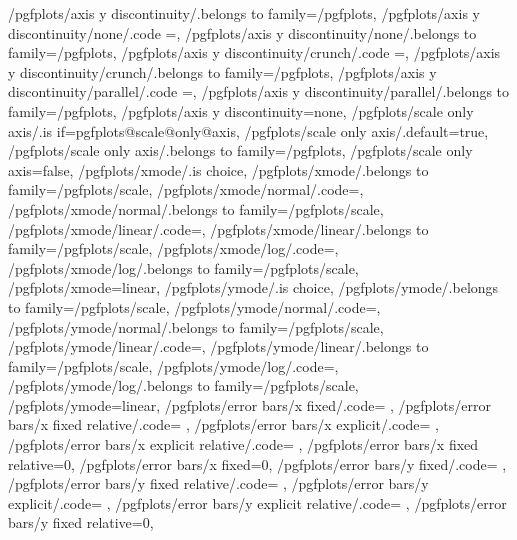 {	/pgfplots/axis y discontinuity/.belongs to family=/pgfplots, %
	/pgfplots/axis y discontinuity/none/.code	={\def\pgfplots@yaxisdiscontnum{0}},
	/pgfplots/axis y discontinuity/none/.belongs to family=/pgfplots, %
	/pgfplots/axis y discontinuity/crunch/.code	={\def\pgfplots@yaxisdiscontnum{1}},
	/pgfplots/axis y discontinuity/crunch/.belongs to family=/pgfplots, %
	/pgfplots/axis y discontinuity/parallel/.code	={\def\pgfplots@yaxisdiscontnum{2}},
	/pgfplots/axis y discontinuity/parallel/.belongs to family=/pgfplots, %
	/pgfplots/axis y discontinuity=none,
	/pgfplots/scale only axis/.is if=pgfplots@scale@only@axis,
	/pgfplots/scale only axis/.default=true,
	/pgfplots/scale only axis/.belongs to family=/pgfplots,
	/pgfplots/scale only axis=false,
	/pgfplots/xmode/.is choice,
	/pgfplots/xmode/.belongs to family=/pgfplots/scale,
	/pgfplots/xmode/normal/.code={\pgfplots@xislineartrue},
	/pgfplots/xmode/normal/.belongs to family=/pgfplots/scale,
	/pgfplots/xmode/linear/.code={\pgfplots@xislineartrue},
	/pgfplots/xmode/linear/.belongs to family=/pgfplots/scale,
	/pgfplots/xmode/log/.code={\pgfplots@xislinearfalse},
	/pgfplots/xmode/log/.belongs to family=/pgfplots/scale,
	/pgfplots/xmode=linear,
	/pgfplots/ymode/.is choice,
	/pgfplots/ymode/.belongs to family=/pgfplots/scale,
	/pgfplots/ymode/normal/.code={\pgfplots@yislineartrue},
	/pgfplots/ymode/normal/.belongs to family=/pgfplots/scale,
	/pgfplots/ymode/linear/.code={\pgfplots@yislineartrue},
	/pgfplots/ymode/linear/.belongs to family=/pgfplots/scale,
	/pgfplots/ymode/log/.code={\pgfplots@yislinearfalse},
	/pgfplots/ymode/log/.belongs to family=/pgfplots/scale,
	/pgfplots/ymode=linear,
	/pgfplots/error bars/x fixed/.code=				\def\pgfplots@errorbars@xfixed{#1}\def\pgfplots@errorbars@xmode{0},
	/pgfplots/error bars/x fixed relative/.code=		\def\pgfplots@errorbars@xrel{#1}\def\pgfplots@errorbars@xmode{1},
	/pgfplots/error bars/x explicit/.code=			\def\pgfplots@errorbars@xmode{2},
	/pgfplots/error bars/x explicit relative/.code=	\def\pgfplots@errorbars@xmode{3},
	/pgfplots/error bars/x fixed relative=0,
	/pgfplots/error bars/x fixed=0,
	/pgfplots/error bars/y fixed/.code=				\def\pgfplots@errorbars@yfixed{#1}\def\pgfplots@errorbars@ymode{0},
	/pgfplots/error bars/y fixed relative/.code=		\def\pgfplots@errorbars@yrel{#1}\def\pgfplots@errorbars@ymode{1},
	/pgfplots/error bars/y explicit/.code=			\def\pgfplots@errorbars@ymode{2},
	/pgfplots/error bars/y explicit relative/.code=	\def\pgfplots@errorbars@ymode{3},
	/pgfplots/error bars/y fixed relative=0,
}
